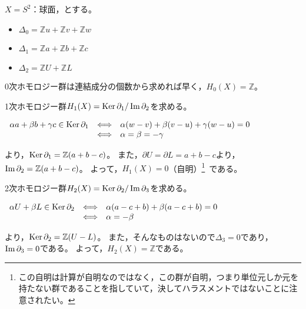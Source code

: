 \documentclass[uplatex]{jsarticle}
\begin{document}
\begin{rei}[球面のホモロジー群]
	$X = S^{2}$：球面，とする。
	\begin{center}
	\end{center}
	\begin{itemize}
		\vspace{-0.5\baselineskip}
		\item $\Delta_{0} = \mathbb{Z} u + \mathbb{Z} v + \mathbb{Z} w$
		\item $\Delta_{1} = \mathbb{Z} a + \mathbb{Z} b + \mathbb{Z} c$
		\item $\Delta_{2} = \mathbb{Z} U + \mathbb{Z} L$
	\end{itemize}

	0次ホモロジー群は連結成分の個数から求めれば早く，$H_{0}(X) = \mathbb{Z}$。

	1次ホモロジー群$H_{1}(X) = \operatorname{Ker} \partial_{1} / \operatorname{Im} \partial_{2}$を求める。
	\renewcommand{\arraystretch}{1}
	\begin{center}
		$\begin{array}{lcl}
			\alpha a + \beta b + \gamma c \in \operatorname{Ker} \partial_{1} & \Longleftrightarrow & \alpha (w-v) + \beta (v-u) + \gamma (w-u) = 0 \\
			& \Longleftrightarrow & \alpha = \beta = - \gamma 
		\end{array}$
	\end{center}
	\renewcommand{\arraystretch}{1.3}
	より，$\operatorname{Ker} \partial_{1} = \mathbb{Z} (a+b-c)$。
	また，$\partial U = \partial L = a+b-c$より，$\operatorname{Im} \partial_{2} = \mathbb{Z} (a+b-c)$。
	よって，$H_{1}(X) = 0$（自明）\footnote{この自明は計算が自明なのではなく，この群が自明，つまり単位元しか元を持たない群であることを指していて，決してハラスメントではないことに注意されたい。}\ である。

	2次ホモロジー群$H_{2}(X) = \operatorname{Ker} \partial_{2} / \operatorname{Im} \partial_{3}$を求める。
	\renewcommand{\arraystretch}{1}
	\begin{center}
		$\begin{array}{lcl}
			\alpha U + \beta L \in \operatorname{Ker} \partial_{2} & \Longleftrightarrow & \alpha (a-c+b) + \beta (a-c+b) = 0 \\
			& \Longleftrightarrow & \alpha = - \beta
		\end{array}$
	\end{center}
	\renewcommand{\arraystretch}{1.3}
	より，$\operatorname{Ker} \partial_{2} = \mathbb{Z} (U-L)$。
	また，そんなものはないので$\Delta_{3} = 0$であり，$\operatorname{Im} \partial_{3} = 0$である。
	よって，$H_{2}(X) = \mathbb{Z}$である。


\end{rei}
\end{document}

